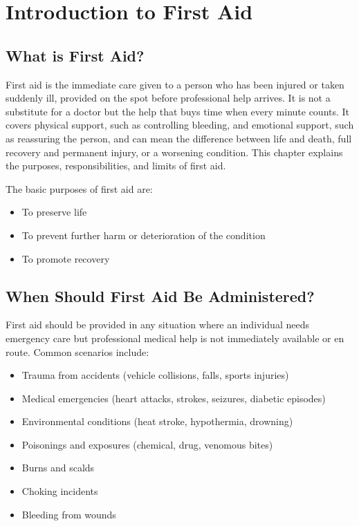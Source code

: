 \chapter{Introduction to First Aid}\label{ch:introduction}

\section{What is First Aid?}

First aid is the immediate care given to a person who has been injured or taken suddenly ill, provided on the spot before professional help arrives. It is not a substitute for a doctor but the help that buys time when every minute counts. It covers physical support, such as controlling bleeding, and emotional support, such as reassuring the person, and can mean the difference between life and death, full recovery and permanent injury, or a worsening condition. This chapter explains the purposes, responsibilities, and limits of first aid.

The basic purposes of first aid are:

\begin{itemize}[leftmargin=*]
  \item To preserve life
  \item To prevent further harm or deterioration of the condition
  \item To promote recovery
\end{itemize}

\section{When Should First Aid Be Administered?}

First aid should be provided in any situation where an individual needs emergency care but professional medical help is not immediately available or en route. Common scenarios include:

\begin{itemize}[leftmargin=*]
  \item Trauma from accidents (vehicle collisions, falls, sports injuries)
  \item Medical emergencies (heart attacks, strokes, seizures, diabetic episodes)
  \item Environmental conditions (heat stroke, hypothermia, drowning)
  \item Poisonings and exposures (chemical, drug, venomous bites)
  \item Burns and scalds
  \item Choking incidents
  \item Bleeding from wounds
\end{itemize}

